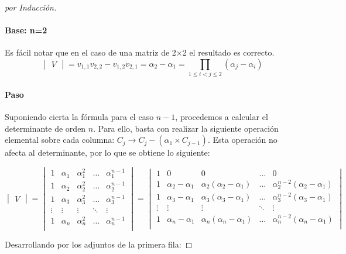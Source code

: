 \begin{proof}[por Inducción]

\paragraph{Base: n=2} Es fácil notar que en el caso de una matriz de 2×2 el resultado es correcto.
\[\begin{vmatrix} V \end{vmatrix}=v_{1,1}v_{2,2} - v_{1,2}v_{2,1}=\alpha_2-\alpha_1=\prod_{1\le i<j\le 2} (\alpha_j-\alpha_i)\]

\paragraph{Paso}
Suponiendo cierta la fórmula para el caso $n-1$, procedemos a calcular el determinante de orden $n$. Para ello, basta con realizar la siguiente operación elemental sobre cada columna: $C_{j}\rightarrow C_{j}-(\alpha_1 \times C_{j-1})$. Esta operación no afecta al determinante, por lo que se obtiene lo siguiente:

\[
\begin{vmatrix} V \end{vmatrix}=\begin{vmatrix}
1 & \alpha_1 & \alpha_1^2 & \dots & \alpha_1^{n-1}\\
1 & \alpha_2 & \alpha_2^2 & \dots & \alpha_2^{n-1}\\
1 & \alpha_3 & \alpha_3^2 & \dots & \alpha_3^{n-1}\\
\vdots & \vdots & \vdots & \ddots &\vdots \\
1 & \alpha_n & \alpha_n^2 & \dots & \alpha_n^{n-1}\\
\end{vmatrix}=\begin{vmatrix}
1 & 0 & 0 & \dots & 0\\
1 & \alpha_2-\alpha_1 & \alpha_2(\alpha_2-\alpha_1) & \dots & \alpha_2^{n-2}(\alpha_2-\alpha_1)\\
1 & \alpha_3-\alpha_1 & \alpha_3(\alpha_3-\alpha_1) & \dots & \alpha_3^{n-2}(\alpha_3-\alpha_1)\\
\vdots & \vdots & \vdots & \ddots &\vdots \\
1 & \alpha_n-\alpha_1 & \alpha_n(\alpha_n-\alpha_1) & \dots & \alpha_n^{n-2}(\alpha_n-\alpha_1)\\
\end{vmatrix}
\]

Desarrollando por los adjuntos de la primera fila: 


\end{proof}
